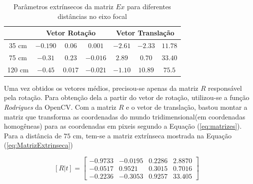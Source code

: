 \begin{table}[!ht]
\centering
\label{tab:extrinsec}
\caption{Parâmetros extrínsecos da matriz $Ex$ para diferentes distâncias no eixo focal}
\begin{tabular}{c|c|c|c|c|c|c|}
\cline{2-7}
                             & \multicolumn{3}{c|}{Vetor Rotação} & \multicolumn{3}{c|}{Vetor Translação} \\ \hline
\multicolumn{1}{|c|}{35 cm}  & $-0.190$   & $0.06$    & $0.001$   & $-2.61$     & $-2.33$    & $11.78$    \\ \hline
\multicolumn{1}{|c|}{75 cm}  & $-0.31$    & $0.23$    & $-0.016$  & $2.89$      & $0.70$     & $33.40$    \\ \hline
\multicolumn{1}{|c|}{120 cm} & $-0.45$    & $0.017$   & $-0.021$  & $-1.10$     & $10.89$    & $75.5$     \\ \hline
\end{tabular}
\end{table}

Uma vez obtidos os vetores médios, precisou-se apenas da matriz $R$ responsável pela rotação. Para obtenção dela a partir do vetor de rotação, utilizou-se a função \textit{Rodrigues} da OpenCV. Com a matriz $R$ e o vetor de translação, bastou montar a matriz que transforma as coordenadas do mundo tridimensional(em coordenadas homogêneas) para as coordenadas em pixeis segundo a Equação (\ref{eq:matrizes}). Para a distância de $75$ cm, tem-se a matriz extrínseca mostrada na Equação (\ref{eq:MatrizExtrinseca})

\begin{equation}
\label{eq:MatrizExtrinseca}
\left[R  | t \right] = 
\begin{bmatrix}
-0.9733 & -0.0195 & 0.2286 & 2.8870 \\
-0.0517 &  0.9521 & 0.3015 & 0.7016 \\
-0.2236 & -0.3053 & 0.9257 & 33.405 
\end{bmatrix}
\end{equation}

